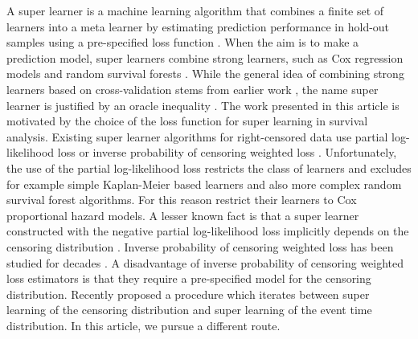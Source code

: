 \documentclass[numsec,webpdf,contemporary,medium,namedate]{oup-authoring-template}%
\theoremstyle{thmstyleone}%
\theoremstyle{thmstyletwo}%
\theoremstyle{thmstylethree}%
\newcommand{\1}{\mathds{1}}
\begin{document}
A super learner is a machine learning algorithm that combines a finite
set of learners into a meta learner by estimating prediction
performance in hold-out samples using a pre-specified loss function
\citep{van2007super}. When the aim is to make a prediction model,
super learners combine strong learners, such as Cox regression models
and random survival forests \citep[][Section 8.4]{gerds2021medical}.
While the general idea of combining strong learners based on cross-validation
stems from earlier work \citep{wolpert1992stacked,breiman1996stacked}, the
name super learner is justified by an oracle inequality
\citep{van2003unicv,vaart2006oracle}.
The work presented in this article is motivated by the choice of the
loss function for super learning in survival analysis. Existing super
learner algorithms for right-censored data use partial log-likelihood
loss or inverse probability of censoring weighted loss
\citep{polley2011-sl-cens,keles2004asymptotically,golmakani2020super,gonzalez2021stacked,westling2021inference}.
Unfortunately, the use of the partial log-likelihood loss restricts
the class of learners and excludes for example simple Kaplan-Meier
based learners and also more complex random survival forest
algorithms. For this reason \cite{golmakani2020super} restrict their
learners to Cox proportional hazard models. A lesser known fact is
that a super learner constructed with the negative partial
log-likelihood loss implicitly depends on the censoring distribution
\citep{hjort1992inference,whitney2019comment}. Inverse probability of
censoring weighted loss has been studied for decades
\citep{graf1999assessment, hothorn2006survival,
  gerds2006consistent}. A disadvantage of inverse probability of
censoring weighted loss estimators is that they require a
pre-specified model for the censoring distribution. Recently
\cite{westling2021inference} proposed a procedure which iterates
between super learning of the censoring distribution and super
learning of the event time distribution. In this article, we pursue a
different route.
\end{document}
